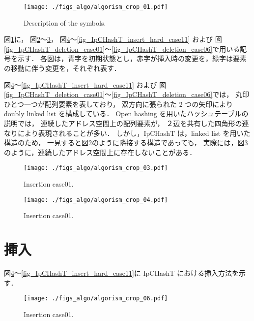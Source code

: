\begin{figure}[h]
  \texttt{[image: ./figs\_algo/algorism\_crop\_01.pdf]}
  \caption{ Description of the symbols. }
  \label{fig_IpCHashT_fig_description}
\end{figure}

図\ref{fig_IpCHashT_fig_description}に，
図\ref{fig_IpCHashT_apparence}〜\ref{fig_IpCHashT_insert_introspection}，
図\ref{fig_IpCHashT_insert_hard_case01}〜\ref{fig_IpCHashT_insert_hard_case11} および
図\ref{fig_IpCHashT_deletion_case01}〜\ref{fig_IpCHashT_deletion_case06}で用いる記号を示す．
各図は，青字を初期状態とし，赤字が挿入時の変更を，緑字は要素の移動に伴う変更を，それぞれ表す．

図\ref{fig_IpCHashT_insert_hard_case01}〜\ref{fig_IpCHashT_insert_hard_case11} および
図\ref{fig_IpCHashT_deletion_case01}〜\ref{fig_IpCHashT_deletion_case06}では，
丸印ひとつ一つが配列要素を表しており，
双方向に張られた 2 つの矢印により doubly linked list を構成している．
Open hashing を用いたハッシュテーブルの説明では，
連続したアドレス空間上の配列要素が，
２辺を共有した四角形の連なりにより表現されることが多い．
しかし，IpCHashT は，linked list を用いた構造のため，
一見すると図\ref{fig_IpCHashT_apparence}のように隣接する構造であっても，
実際には，図\ref{fig_IpCHashT_insert_introspection}のように，連続したアドレス空間上に存在しないことがある．

\begin{figure}[h]
  \texttt{[image: ./figs\_algo/algorism\_crop\_03.pdf]}
  \caption{ Insertion case01. }
  \label{fig_IpCHashT_apparence}
\end{figure}

\begin{figure}[h]
  \texttt{[image: ./figs\_algo/algorism\_crop\_04.pdf]}
  \caption{ Insertion case01. }
  \label{fig_IpCHashT_insert_introspection}
\end{figure}

\section{挿入}

図\ref{fig_IpCHashT_insert_hard_case01}〜\ref{fig_IpCHashT_insert_hard_case11}に IpCHashT における挿入方法を示す．


\begin{figure}[h]
  \texttt{[image: ./figs\_algo/algorism\_crop\_06.pdf]}
  \caption{ Insertion case01. }
  \label{fig_IpCHashT_insert_hard_case01}
\end{figure}

